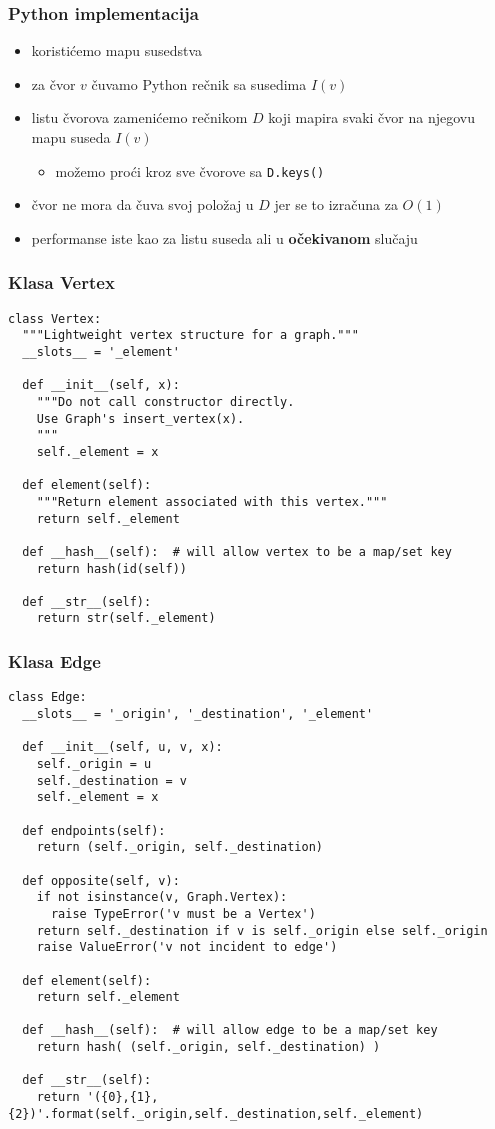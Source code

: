 \documentclass[compress,aspectratio=169]{beamer}
\begin{document}
\begin{frame}[fragile]
  \frametitle{Python implementacija}
  \begin{itemize}
    \item koristićemo mapu susedstva
    \item za čvor $v$ čuvamo Python rečnik sa susedima $I(v)$
    \item listu čvorova zamenićemo rečnikom $D$ koji mapira svaki čvor 
      na njegovu mapu suseda $I(v)$
    \begin{itemize}
      \item možemo proći kroz sve čvorove sa \texttt{D.keys()}
    \end{itemize}
    \item čvor ne mora da čuva svoj položaj u $D$ jer se to izračuna za 
      $O(1)$
    \item performanse iste kao za listu suseda ali u \textbf{očekivanom}
      slučaju
  \end{itemize}
\end{frame}

\begin{frame}
  \frametitle{Klasa Vertex}
\begin{verbatim}
class Vertex:
  """Lightweight vertex structure for a graph."""
  __slots__ = '_element'

  def __init__(self, x):
    """Do not call constructor directly. 
    Use Graph's insert_vertex(x).
    """
    self._element = x

  def element(self):
    """Return element associated with this vertex."""
    return self._element

  def __hash__(self):  # will allow vertex to be a map/set key
    return hash(id(self))

  def __str__(self):
    return str(self._element)
\end{verbatim}
\end{frame}

\begin{frame}
  \frametitle{Klasa Edge}
\begin{verbatim}
class Edge:
  __slots__ = '_origin', '_destination', '_element'

  def __init__(self, u, v, x):
    self._origin = u
    self._destination = v
    self._element = x

  def endpoints(self):
    return (self._origin, self._destination)

  def opposite(self, v):
    if not isinstance(v, Graph.Vertex):
      raise TypeError('v must be a Vertex')
    return self._destination if v is self._origin else self._origin
    raise ValueError('v not incident to edge')

  def element(self):
    return self._element

  def __hash__(self):  # will allow edge to be a map/set key
    return hash( (self._origin, self._destination) )

  def __str__(self):
    return '({0},{1},{2})'.format(self._origin,self._destination,self._element)
\end{verbatim}
\end{frame}
\end{document}

